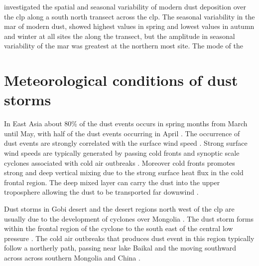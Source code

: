 \textcite{sun2003seasonal} investigated the spatial and seasonal variability of modern dust deposition over the \acrshort{clp} along a south north transect across the \acrshort{clp}. 
The seasonal variability in the \acrshort{mar} of modern dust, showed highest values in spring and lowest values in autumn and winter at all sites the along the transect, but the amplitude in seasonal variability of the \acrshort{mar} was greatest at the northern most site. The mode of the 
\section{Meteorological conditions of dust storms}

In East Asia about 80\% of the dust events occurs in spring months from March until May, with half of the dust events occurring in April \parencite{sun2001spatial}. 
The occurrence of dust events are strongly correlated with the surface wind speed \parencite{kurosaki2003recent}. 
Strong surface wind speeds are typically generated by passing cold fronts and synoptic scale cyclones associated with cold air outbreaks \parencite{sun2001spatial, zhou2003typical, takemi2005dust}.
Moreover cold fronts promotes strong and deep vertical mixing due to the strong surface heat flux in the cold frontal region. The deep mixed layer can carry the dust into the upper troposphere allowing the dust to be transported far downwind \parencite{liu2003high}. 
  
Dust storms in Gobi desert and the desert regions north west of the \acrshort{clp} are usually due to the development of cyclones over Mongolia \parencite{shao2006review}. 
The dust storm forms within the frontal region of the cyclone to the south east of the central low pressure \parencite{takemi2005dust}. 
The cold air outbreaks that produces dust event in this region typically follow a northerly path, passing near lake Baikal and the moving southward across across southern Mongolia and China \parencite{sun2001spatial}. 

